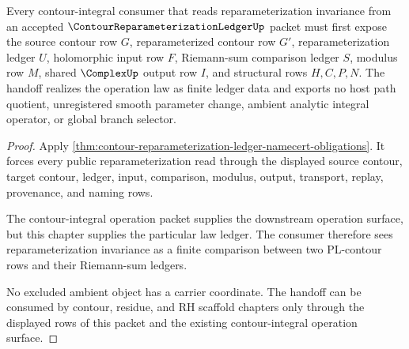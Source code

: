 \begin{theorem}
\label{thm:contour-reparameterization-ledger-contourintegral-handoff}
Every contour-integral consumer that reads reparameterization invariance from an accepted $\ContourReparameterizationLedgerUp$ packet must first expose the source contour row $G$, reparameterized contour row $G'$, reparameterization ledger $U$, holomorphic input row $F$, Riemann-sum comparison ledger $S$, modulus row $M$, shared $\ComplexUp$ output row $I$, and structural rows $H,C,P,N$. The handoff realizes the operation law as finite ledger data and exports no host path quotient, unregistered smooth parameter change, ambient analytic integral operator, or global branch selector.
\end{theorem}
\begin{proof}
Apply \autoref{thm:contour-reparameterization-ledger-namecert-obligations}. It forces every public reparameterization read through the displayed source contour, target contour, ledger, input, comparison, modulus, output, transport, replay, provenance, and naming rows.

The contour-integral operation packet supplies the downstream operation surface, but this chapter supplies the particular law ledger. The consumer therefore sees reparameterization invariance as a finite comparison between two PL-contour rows and their Riemann-sum ledgers.

No excluded ambient object has a carrier coordinate. The handoff can be consumed by contour, residue, and RH scaffold chapters only through the displayed rows of this packet and the existing contour-integral operation surface.
\end{proof}



